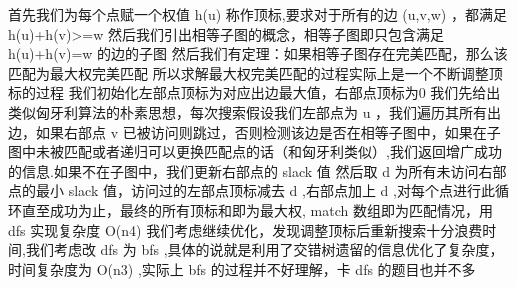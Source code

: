 {}首先我们为每个点赋一个权值\markdownRendererDollarSign{} h(u) \markdownRendererDollarSign{}称作顶标,要求对于所有的边\markdownRendererDollarSign{} (u,v,w) \markdownRendererDollarSign{}，都满足\markdownRendererDollarSign{} h(u)+h(v)>=w \markdownRendererDollarSign{}\markdownRendererParagraphSeparator
{}然后我们引出相等子图的概念，相等子图即只包含满足\markdownRendererDollarSign{} h(u)+h(v)=w \markdownRendererDollarSign{}的边的子图\markdownRendererParagraphSeparator
{}然后我们有定理：如果相等子图存在完美匹配，那么该匹配为最大权完美匹配\markdownRendererParagraphSeparator
{}所以求解最大权完美匹配的过程实际上是一个不断调整顶标的过程\markdownRendererParagraphSeparator
{}我们初始化左部点顶标为对应出边最大值，右部点顶标为0\markdownRendererParagraphSeparator
{}我们先给出类似匈牙利算法的朴素思想，每次搜索假设我们左部点为\markdownRendererDollarSign{} u \markdownRendererDollarSign{}，我们遍历其所有出边，如果右部点\markdownRendererDollarSign{} v \markdownRendererDollarSign{}已被访问则跳过，否则检测该边是否在相等子图中，如果在子图中未被匹配或者递归可以更换匹配点的话（和匈牙利类似）,我们返回增广成功的信息.如果不在子图中，我们更新右部点的\markdownRendererDollarSign{} slack \markdownRendererDollarSign{}值\markdownRendererParagraphSeparator
{}然后取\markdownRendererDollarSign{} d \markdownRendererDollarSign{}为所有未访问右部点的最小\markdownRendererDollarSign{} slack \markdownRendererDollarSign{}值，访问过的左部点顶标减去\markdownRendererDollarSign{} d \markdownRendererDollarSign{},右部点加上\markdownRendererDollarSign{} d\markdownRendererSoftLineBreak
{}\markdownRendererDollarSign{},对每个点进行此循环直至成功为止，最终的所有顶标和即为最大权,\markdownRendererDollarSign{} match \markdownRendererDollarSign{}数组即为匹配情况，用\markdownRendererDollarSign{} dfs \markdownRendererDollarSign{}实现复杂度\markdownRendererDollarSign{} O(n\markdownRendererCircumflex{}4) \markdownRendererDollarSign{}\markdownRendererInterblockSeparator
{}\markdownRendererInterblockSeparator
{}我们考虑继续优化，发现调整顶标后重新搜索十分浪费时间,我们考虑改\markdownRendererDollarSign{} dfs \markdownRendererDollarSign{}为\markdownRendererDollarSign{} bfs \markdownRendererDollarSign{},具体的说就是利用了交错树遗留的信息优化了复杂度，时间复杂度为\markdownRendererDollarSign{} O(n\markdownRendererCircumflex{}3) \markdownRendererDollarSign{},实际上\markdownRendererDollarSign{} bfs \markdownRendererDollarSign{}的过程并不好理解，卡\markdownRendererDollarSign{} dfs \markdownRendererDollarSign{}的题目也并不多\markdownRendererInterblockSeparator
